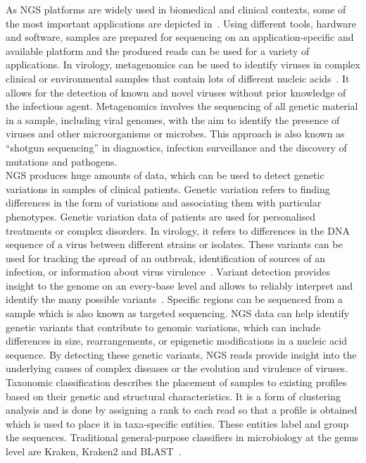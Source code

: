 As \ac{NGS} platforms are widely used in biomedical and clinical contexts, some of the most important applications are depicted in~. Using different tools, hardware and software, samples are prepared for sequencing on an application-specific and available platform and the produced reads can be used for a variety of applications. In virology, metagenomics can be used to identify viruses in complex clinical or environmental samples that contain lots of different nucleic acids~\cite{chiu2019clinical}. It allows for the detection of known and novel viruses without prior knowledge of the infectious agent. Metagenomics involves the sequencing of all genetic material in a sample, including viral genomes, with the aim to identify the presence of viruses and other microorganisms or microbes. This approach is also known as ``shotgun sequencing'' in diagnostics, infection surveillance and the discovery of mutations and pathogens. \\
\ac{NGS} produces huge amounts of data, which can be used to detect genetic variations in samples of clinical patients. Genetic variation refers to finding differences in the form of variations and associating them with particular phenotypes. Genetic variation data of patients are used for personalised treatments or complex disorders. In virology, it refers to differences in the \ac{DNA} sequence of a virus between different strains or isolates. These variants can be used for tracking the spread of an outbreak, identification of sources of an infection, or information about virus virulence~\cite{capobianchi2013next}. Variant detection provides insight to the genome on an every-base level and allows to reliably interpret and identify the many possible variants~\cite{koboldt2013next}. Specific regions can be sequenced from a sample which is also known as targeted sequencing. \ac{NGS} data can help identify genetic variants that contribute to genomic variations, which can include differences in size, rearrangements, or epigenetic modifications in a nucleic acid sequence. By detecting these genetic variants, \ac{NGS} reads provide insight into the underlying causes of complex diseases or the evolution and virulence of viruses. \\ 
Taxonomic classification describes the placement of samples to existing profiles based on their genetic and structural characteristics. It is a form of clustering analysis and is done by assigning a rank to each read so that a profile is obtained which is used to place it in taxa-specific entities. These entities label and group the sequences. Traditional general-purpose classifiers in microbiology at the genus level are Kraken, Kraken2 and \ac{BLAST}~\cite{wood2014kraken, wood2019improved, altschul1997gapped}.
